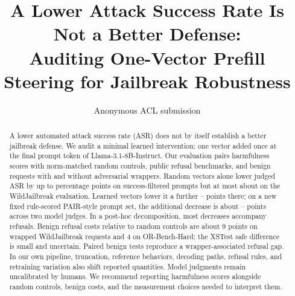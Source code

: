 \documentclass[11pt]{article}
\title{A Lower Attack Success Rate Is Not a Better Defense:\\Auditing One-Vector Prefill Steering for Jailbreak Robustness}
\author{Anonymous ACL submission}
\begin{document}


\maketitle
\begin{abstract}
A lower automated attack success rate (ASR) does not by itself establish a better jailbreak defense. We audit a minimal learned intervention: one vector added once at the final prompt token of Llama-3.1-8B-Instruct. Our evaluation pairs harmfulness scores with norm-matched random controls, public refusal benchmarks, and benign requests with and without adversarial wrappers. Random vectors alone lower judged ASR by up to \valRandomMaxDrop{} percentage points on success-filtered prompts but at most about \wjbRandomMaxDrop{} on the WildJailbreak evaluation. Learned vectors lower it a further \wjbExtraMinDrop{}--\wjbExtraMaxDrop{} points there; on a new fixed rule-scored PAIR-style prompt set, the additional decrease is about \pairExtraWG{}--\pairExtraHB{} points across two model judges. In a post-hoc decomposition, most decreases accompany refusals. Benign refusal costs relative to random controls are about 9 points on wrapped WildJailbreak requests and 4 on OR-Bench-Hard; the XSTest safe difference is small and uncertain. Paired benign tests reproduce a wrapper-associated refusal gap. In our own pipeline, truncation, reference behaviors, decoding paths, refusal rules, and retraining variation also shift reported quantities. Model judgments remain uncalibrated by humans. We recommend reporting harmfulness scores alongside random controls, benign costs, and the measurement choices needed to interpret them.
\end{abstract}









\appendix


\end{document}
